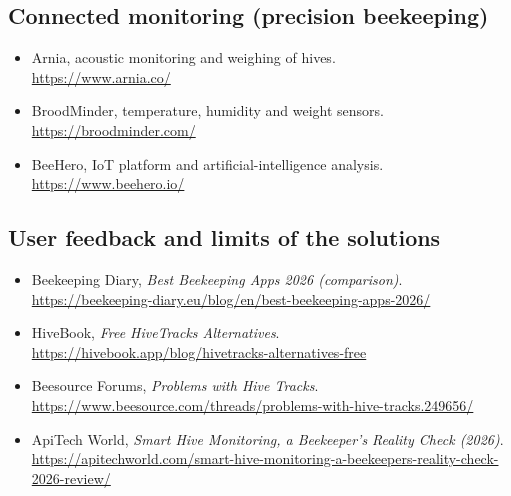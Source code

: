 \subsection*{Connected monitoring (precision beekeeping)}
\begin{itemize}
  \item Arnia, acoustic monitoring and weighing of hives.\\ \url{https://www.arnia.co/}
  \item BroodMinder, temperature, humidity and weight sensors.\\ \url{https://broodminder.com/}
  \item BeeHero, IoT platform and artificial-intelligence analysis.\\ \url{https://www.beehero.io/}
\end{itemize}

\subsection*{User feedback and limits of the solutions}
\begin{itemize}
  \item Beekeeping Diary, \emph{Best Beekeeping Apps 2026 (comparison)}.\\ \url{https://beekeeping-diary.eu/blog/en/best-beekeeping-apps-2026/}
  \item HiveBook, \emph{Free HiveTracks Alternatives}.\\ \url{https://hivebook.app/blog/hivetracks-alternatives-free}
  \item Beesource Forums, \emph{Problems with Hive Tracks}.\\ \url{https://www.beesource.com/threads/problems-with-hive-tracks.249656/}
  \item ApiTech World, \emph{Smart Hive Monitoring, a Beekeeper's Reality Check (2026)}.\\ \url{https://apitechworld.com/smart-hive-monitoring-a-beekeepers-reality-check-2026-review/}
\end{itemize}
